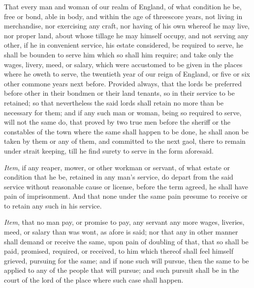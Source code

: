 \documentclass[
  letterpaper,
  11pt,
  DIV=9,
  openright]{scrbook}
\begin{document}
That every man and woman of our realm of England, of what condition he
be, free or bond, able in body, and within the age of threescore years,
not living in merchandise, nor exercising any craft, nor having of his
own whereof he may live, nor proper land, about whose tillage he may
himself occupy, and not serving any other, if he in convenient service,
his estate considered, be required to serve, he shall be bounden to
serve him which so shall him require; and take only the wages, livery,
meed, or salary, which were accustomed to be given in the places where
he oweth to serve, the twentieth year of our reign of England, or five
or six other commone years next before. Provided always, that the lords
be preferred before other in their bondmen or their land tenants, so in
their service to be retained; so that nevertheless the said lords shall
retain no more than be necessary for them; and if any such man or woman,
being so required to serve, will not the same do, that proved by two
true men before the sheriff or the constables of the town where the same
shall happen to be done, he shall anon be taken by them or any of them,
and committed to the next gaol, there to remain under strait keeping,
till he find surety to serve in the form aforesaid.

\emph{Item}, if any reaper, mower, or other workman or servant, of what
estate or condition that he be, retained in any man's service, do depart
from the said service without reasonable cause or license, before the
term agreed, he shall have pain of imprisonment. And that none under the
same pain presume to receive or to retain any such in his service.

\emph{Item}, that no man pay, or promise to pay, any servant any more
wages, liveries, meed, or salary than was wont, as afore is said; nor
that any in other manner shall demand or receive the same, upon pain of
doubling of that, that so shall be paid, promised, required, or
received, to him which thereof shall feel himself grieved, pursuing for
the same; and if none such will pursue, then the same to be applied to
any of the people that will pursue; and such pursuit shall be in the
court of the lord of the place where such case shall happen.

\end{document}
